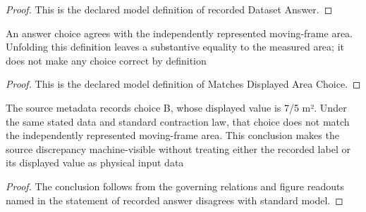 \begin{proof}
  This is the declared model definition of recorded Dataset Answer.
\end{proof}
\begin{definition}
  \label{def:physics:phyx-mini-0566:phyxminiproblems-problemphyxmini0566-matchesdisplayedareachoice}
  An answer choice agrees with the independently represented moving-frame area. Unfolding this definition leaves a substantive equality to the measured area; it does not make any choice correct by definition
\end{definition}
\begin{proof}
  This is the declared model definition of Matches Displayed Area Choice.
\end{proof}
\begin{theorem}
  \label{thm:physics:phyx-mini-0566:phyxminiproblems-problemphyxmini0566-recorded-answer-disagrees-with-standard-model}
  The source metadata records choice B, whose displayed value is 7/5 m². Under the same stated data and standard contraction law, that choice does not match the independently represented moving-frame area. This conclusion makes the source discrepancy machine-visible without treating either the recorded label or its displayed value as physical input data
\end{theorem}
\begin{proof}
  The conclusion follows from the governing relations and figure readouts named in the statement of recorded answer disagrees with standard model.
\end{proof}
